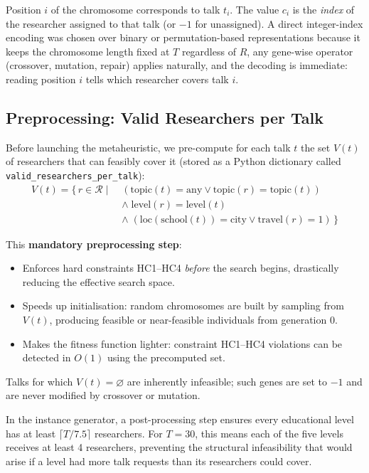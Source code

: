 \documentclass[12pt, a4paper]{article}
\begin{document}
Position $i$ of the chromosome corresponds to talk $t_i$. The value $c_i$ is the
\emph{index} of the researcher assigned to that talk (or $-1$ for unassigned).
A direct integer-index encoding was chosen over binary or permutation-based
representations because it keeps the chromosome length fixed at $T$ regardless
of $R$, any gene-wise operator (crossover, mutation, repair) applies naturally,
and the decoding is immediate: reading position $i$ tells which researcher
covers talk $i$.

\subsection{Preprocessing: Valid Researchers per Talk}

Before launching the metaheuristic, we pre-compute for each talk $t$ the set
$V(t)$ of researchers that can feasibly cover it (stored as a Python dictionary
called \texttt{valid\_r\-es\-ear\-chers\_per\_talk}):
\begin{align}
  V(t) = \{\, r \in \mathcal{R} \mid\;
            &(\text{topic}(t) = \text{any} \lor \text{topic}(r) = \text{topic}(t))\nonumber\\
            &\land\; \text{level}(r) = \text{level}(t)\nonumber\\
            &\land\; (\text{loc}(\text{school}(t)) = \text{city} \lor \text{travel}(r) = 1)
            \,\}\nonumber
\end{align}

This \textbf{mandatory preprocessing step}:
\begin{itemize}[itemsep=0.1em]
  \item Enforces hard constraints HC1–HC4 \emph{before} the search begins, drastically
        reducing the effective search space.
  \item Speeds up initialisation: random chromosomes are built by sampling from $V(t)$,
        producing feasible or near-feasible individuals from generation 0.
  \item Makes the fitness function lighter: constraint HC1–HC4 violations can be detected
        in $O(1)$ using the precomputed set.
\end{itemize}

Talks for which $V(t) = \varnothing$ are inherently infeasible; such genes are set to
$-1$ and are never modified by crossover or mutation.

In the instance generator, a post-processing step ensures every educational level
has at least $\lceil T / 7.5\rceil$ researchers. For $T = 30$, this means each
of the five levels receives at least 4 researchers, preventing the structural
infeasibility that would arise if a level had more talk requests than its
researchers could cover.
\end{document}
